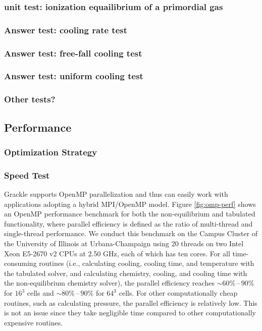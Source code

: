 \subsubsection{unit test: ionization equailibrium of a primordial gas}
\label{sec:primordial-test}

\subsubsection{Answer test: cooling rate test}
\label{sec:cooling-rate-test}

\subsubsection{Answer test: free-fall cooling test}
\label{sec:free-fall-test}

\subsubsection{Answer test: uniform cooling test}
\label{sec:uniform-cooling-test}

\subsubsection{Other tests?}


\subsection{Performance}


\subsubsection{Optimization Strategy}


\subsubsection{Speed Test}

Grackle supports OpenMP parallelization and thus can easily work with
applications adopting a hybrid MPI/OpenMP model.
Figure \ref{fig:omp-perf} shows an OpenMP performance benchmark for both the
non-equilibrium and tabulated functionality, where parallel efficiency is
defined as the ratio of multi-thread and single-thread performance. We
conduct this benchmark on the Campus Cluster of the University of Illinois
at Urbana-Champaign using 20 threads on two Intel Xeon E5-2670 v2 CPUs
at 2.50 GHz, each of which has ten cores. For all time-consuming routines
(i.e., calculating cooling, cooling time, and temperature with the tabulated
solver, and calculating chemistry, cooling, and cooling time with the
non-equilibrium chemistry solver), the parallel efficiency reaches
$\sim 60\%\,\text{--}\,90\%$ for $16^3$ cells and
$\sim 80\%\,\text{--}\,90\%$ for $64^3$ cells. For other computationally cheap
routines, such as calculating pressure, the parallel efficiency is relatively
low. This is not an issue since they take negligible time compared to other
computationally expensive routines.

